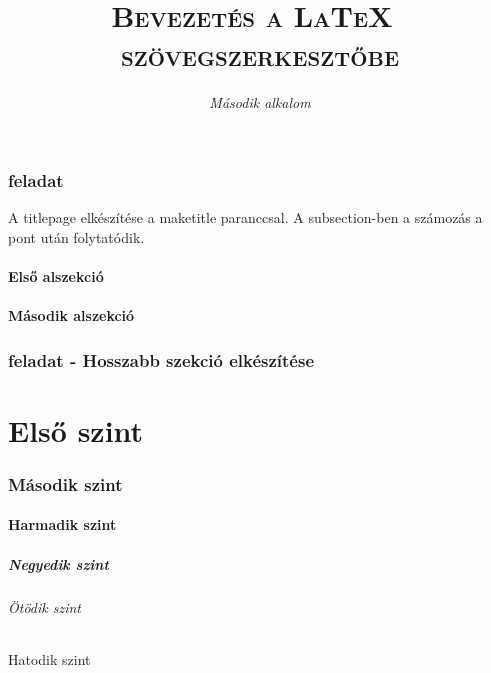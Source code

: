 \documentclass{article}
\begin{document}
	\begin{titlepage}
		\title{\textsc{\huge{Bevezetés a \LaTeX\ \\ szövegszerkesztőbe}}}
		\author{\textit{\Large{Második alkalom}}}
		\maketitle
	\end{titlepage}

\setcounter{tocdepth}{5}
\tableofcontents
\clearpage
{}
\section{feladat}
A titlepage elkészítése a maketitle paranccsal. A subsection-ben a számozás a pont után folytatódik.
\subsection{Első alszekció}
\hulipsum[2]
\clearpage
\subsection{Második alszekció}
\hulipsum[3]
\section{feladat - Hosszabb szekció elkészítése}
\part{Első szint}
\section{Második szint}
\subsection{Harmadik szint}
\subsubsection{Negyedik szint}
\paragraph{Ötödik szint}
\subparagraph{Hatodik szint}


		
\end{document}
